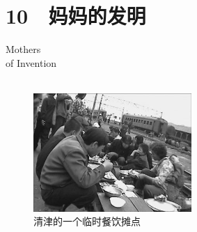 \fancyhead[RO]{{\tiny{\textcolor{Gray}{\FA \ }}}\thepage}
\fancyhead[LE]{{\tiny{\textcolor{Gray}{\FA \ }}}\thepage}
\fancyfoot[LE,RO]{}
\fancyfoot[LO,CE]{}
\fancyfoot[CO,RE]{}
\chapter*{10 {\FA } 妈妈的发明}
\vspace{5mm}
\begin{flushright}
	\textcolor{PinYinColor}{\EN \huge{Mothers\\
	of Invention\\
	\ \\}}
\end{flushright}

\begin{figure}[!htbp]
	\centering
	\includegraphics[width=6cm]{./Chapters/Images/10.jpg}
	\caption*{清津的一个临时餐饮摊点}
\end{figure}

